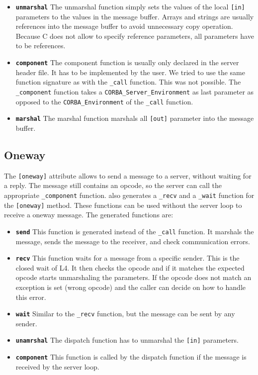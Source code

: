 \begin{itemize}
\item \textbf{\texttt{unmarshal}} The unmarshal function simply sets the values
      of the local \verb|[in]| parameters to the values in the message buffer.
      Arrays and strings are usually references into the message buffer to 
      avoid unnecessary copy operation.  Because C does not allow to specify
      reference parameters, all parameters have to be references.

\item \textbf{\texttt{component}} The component function is usually only 
      declared in the server header file.  It has to be implemented by the 
      user.  We tried to use the same function signature as with the 
      \verb|_call| function.  This was not possible.  The \verb|_component|
      function takes a \verb|CORBA_Server_Environment| as last parameter
      as opposed to the \verb|CORBA_Environment| of the \verb|_call|
      function.

\item \textbf{\texttt{marshal}} The marshal function marshals all \verb|[out]|
      parameter into the message buffer.
\end{itemize}

\subsection{Oneway}

The \verb|[oneway]| attribute allows to send a message to a server, without
waiting for a reply.  The message still contains an opcode, so the server can
call the appropriate \verb|_component| function.  \dice{} also generates a
\verb|_recv| and a \verb|_wait| function for the \verb|[oneway]| method.
These functions can be used without the server loop to receive a oneway
message.  The generated functions are:

\begin{itemize}
\item \textbf{\texttt{send}} This function is generated instead of the 
      \verb|_call| function. It marshals the message, sends the message
      to the receiver, and check communication errors.

\item \textbf{\texttt{recv}} This function waits for a message from a specific
      sender.  This is the closed wait of L4.  It then checks the opcode
      and if it matches the expected opcode starts unmarshaling the parameters.
      If the opcode does not match an exception is set (wrong opcode) and the
      caller can decide on how to handle this error.

\item \textbf{\texttt{wait}} Similar to the \verb|_recv| function, but the
      message can be sent by any sender.

\item \textbf{\texttt{unamrshal}} The dispatch function has to unmarshal the
      \verb|[in]| parameters.

\item \textbf{\texttt{component}} This function is called by the dispatch 
      function if the message is received by the server loop.
\end{itemize}

